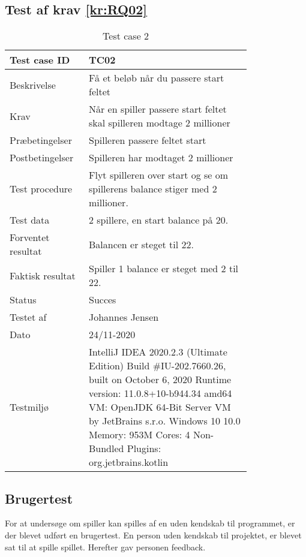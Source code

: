 \newpage
\subsection{Test af krav \ref{kr:RQ02}}

\begin{table}[h]
    \centering
    \begin{tabular}{|p{0.20\linewidth} | p{0.6\linewidth}|}
    \hline
        Test case ID & TC02 \\
        \hline
        Beskrivelse & Få et beløb når du passere start feltet \\
        \hline
        Krav & Når en spiller passere start feltet skal spilleren modtage 2 millioner\\
        \hline
        Præbetingelser & Spilleren passere feltet start \\
        \hline
        Postbetingelser & Spilleren har modtaget 2 millioner \\
        \hline
        Test procedure & Flyt spilleren over start og se om spillerens balance stiger med 2 millioner.\\
        \hline
        Test data & 2 spillere, en start balance på 20. \\
        \hline
        Forventet resultat & Balancen er steget til 22. \\
        \hline
        Faktisk resultat & Spiller 1 balance er steget med 2 til 22. \\
        \hline
        Status & Succes\\
        \hline
        Testet af & Johannes Jensen \\
        \hline
        Dato & 24/11-2020 \\
        \hline
        Testmiljø & IntelliJ IDEA 2020.2.3 (Ultimate Edition)
Build \#IU-202.7660.26, built on October 6, 2020
Runtime version: 11.0.8+10-b944.34 amd64
VM: OpenJDK 64-Bit Server VM by JetBrains s.r.o.
Windows 10 10.0
Memory: 953M
Cores: 4
Non-Bundled Plugins: org.jetbrains.kotlin\\
        \hline
    \end{tabular}
    \caption{Test case 2}
    \label{tab:TC02}
\end{table}
\clearpage


\subsection{Brugertest}
For at undersøge om spiller kan spilles af en uden kendskab til programmet, er der blevet udført en brugertest. En person uden kendskab til projektet, er blevet sat til at spille spillet. Herefter gav personen feedback. 

